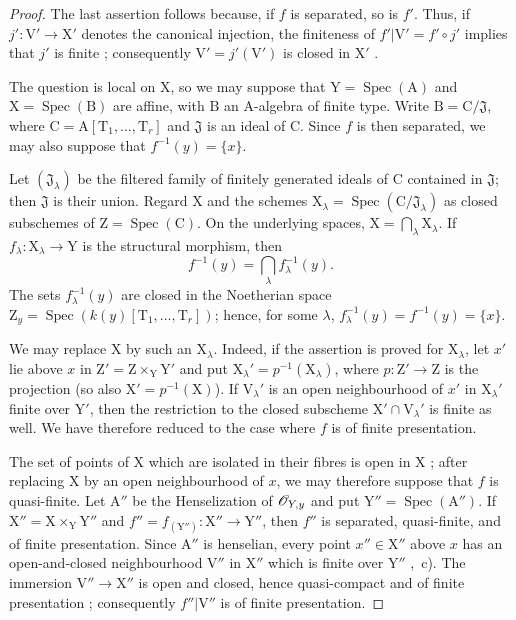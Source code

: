 \begin{proof}
The last assertion follows because, if $f$ is separated, so is $f'$. Thus, if $j':\mathrm{V}'\to\mathrm{X}'$ denotes the canonical injection, the finiteness of $f'|\mathrm{V}'=f'\circ j'$ implies that $j'$ is finite ; consequently $\mathrm{V}'=j'(\mathrm{V}')$ is closed in $\mathrm{X}'$ .

The question is local on $\mathrm{X}$, so we may suppose that $\mathrm{Y}=\operatorname{Spec}(\mathrm{A})$ and $\mathrm{X}=\operatorname{Spec}(\mathrm{B})$ are affine, with $\mathrm{B}$ an $\mathrm{A}$-algebra of finite type. Write $\mathrm{B}=\mathrm{C}/\mathfrak{J}$, where $\mathrm{C}=\mathrm{A}[\mathrm{T}_1,\ldots,\mathrm{T}_r]$ and $\mathfrak{J}$ is an ideal of $\mathrm{C}$. Since $f$ is then separated, we may also suppose that $f^{-1}(y)=\{x\}$.

Let $(\mathfrak{J}_\lambda)$ be the filtered family of finitely generated ideals of $\mathrm{C}$ contained in $\mathfrak{J}$; then $\mathfrak{J}$ is their union. Regard $\mathrm{X}$ and the schemes $\mathrm{X}_\lambda=\operatorname{Spec}(\mathrm{C}/\mathfrak{J}_\lambda)$ as closed subschemes of $\mathrm{Z}=\operatorname{Spec}(\mathrm{C})$. On the underlying spaces, $\mathrm{X}=\bigcap_\lambda\mathrm{X}_\lambda$. If $f_\lambda:\mathrm{X}_\lambda\to\mathrm{Y}$ is the structural morphism, then
\[
  f^{-1}(y)=\bigcap_\lambda f_\lambda^{-1}(y).
\]
The sets $f_\lambda^{-1}(y)$ are closed in the Noetherian space $\mathrm{Z}_y=\operatorname{Spec}(k(y)[\mathrm{T}_1,\ldots,\mathrm{T}_r])$; hence, for some $\lambda$, $f_\lambda^{-1}(y)=f^{-1}(y)=\{x\}$.

We may replace $\mathrm{X}$ by such an $\mathrm{X}_\lambda$. Indeed, if the assertion is proved for $\mathrm{X}_\lambda$, let $x'$ lie above $x$ in $\mathrm{Z}'=\mathrm{Z}\times_{\mathrm{Y}}\mathrm{Y}'$ and put $\mathrm{X}_\lambda'=p^{-1}(\mathrm{X}_\lambda)$, where $p:\mathrm{Z}'\to\mathrm{Z}$ is the projection (so also $\mathrm{X}'=p^{-1}(\mathrm{X})$). If $\mathrm{V}_\lambda'$ is an open neighbourhood of $x'$ in $\mathrm{X}_\lambda'$ finite over $\mathrm{Y}'$, then the restriction to the closed subscheme $\mathrm{X}'\cap\mathrm{V}_\lambda'$ is finite as well. We have therefore reduced to the case where $f$ is of finite presentation.

The set of points of $\mathrm{X}$ which are isolated in their fibres is open in $\mathrm{X}$ ; after replacing $\mathrm{X}$ by an open neighbourhood of $x$, we may therefore suppose that $f$ is quasi-finite. Let $\mathrm{A}''$ be the Henselization of $\mathscr{O}_{Y,y}$ and put $\mathrm{Y}''=\operatorname{Spec}(\mathrm{A}'')$. If $\mathrm{X}''=\mathrm{X}\times_{\mathrm{Y}}\mathrm{Y}''$ and $f''=f_{(\mathrm{Y}'')}:\mathrm{X}''\to\mathrm{Y}''$, then $f''$ is separated, quasi-finite, and of finite presentation. Since $\mathrm{A}''$ is henselian, every point $x''\in\mathrm{X}''$ above $x$ has an open-and-closed neighbourhood $\mathrm{V}''$ in $\mathrm{X}''$ which is finite over $\mathrm{Y}''$ ,~c). The immersion $\mathrm{V}''\to\mathrm{X}''$ is open and closed, hence quasi-compact and of finite presentation ; consequently $f''|\mathrm{V}''$ is of finite presentation.


\end{proof}
